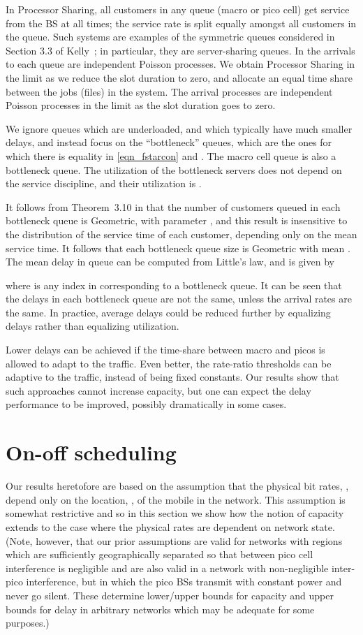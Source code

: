\documentclass[12pt, draftcls, onecolumn]{IEEEtranTCOM}
\begin{document}
{In Processor Sharing, all customers in any queue (macro or pico cell) get service from the BS at all times; the service rate is split equally amongst all customers in the queue. Such systems are examples of the symmetric queues considered in Section 3.3 of Kelly~\cite{Kelly79}; in particular, they are server-sharing queues. In \cite{Kelly79} the arrivals to each queue are independent Poisson processes. We obtain Processor Sharing in the limit as we reduce the slot duration to zero, and allocate an equal time share between the jobs (files) in the system. The arrival processes are independent Poisson processes in the limit as the slot duration goes to zero.

We ignore queues which are underloaded, and which typically have much smaller delays, and instead focus on the ``bottleneck'' queues, which are the ones for which there is equality in \eqref{eqn_fstarcon} and . The macro cell queue is also a bottleneck queue. The utilization of the bottleneck servers does not depend on the service discipline, and their utilization is .

It follows from Theorem~3.10 in \cite{Kelly79} that the number of customers queued in each bottleneck queue is Geometric, with parameter , and this result is insensitive to the distribution of the service time of each customer, depending only on the mean service time. It follows that each bottleneck queue size is Geometric with mean . The mean delay in queue  can be computed from Little's law, and is given by

where  is any index in  corresponding to a bottleneck queue. It can be seen that the delays in each bottleneck queue are not the same, unless the arrival rates are the same. In practice, average delays could be reduced further by equalizing delays rather than equalizing utilization.

Lower delays can be achieved if the time-share between macro and picos is allowed to adapt to the traffic. Even better, the rate-ratio thresholds can be adaptive to the traffic, instead of being fixed constants. Our results show that such approaches cannot increase capacity, but one can expect the delay performance to be improved, possibly dramatically in some cases.

\section{On-off scheduling}
\label{sec_genschedule}
Our results heretofore are based on the assumption that  the physical bit rates, , depend only on the location, , of the mobile in the network. This assumption is somewhat restrictive and so in this section we
show how the notion of capacity extends to the case where the physical rates are dependent on network state.
(Note, however, that our prior assumptions are valid for networks with regions  which are sufficiently geographically separated so that between pico cell interference is negligible and are also valid in a network with non-negligible inter-pico interference, but in which the pico BSs transmit with constant power and never go silent. These determine lower/upper bounds for capacity and upper bounds for delay in arbitrary networks which may be adequate for some purposes.)


}
\end{document}
